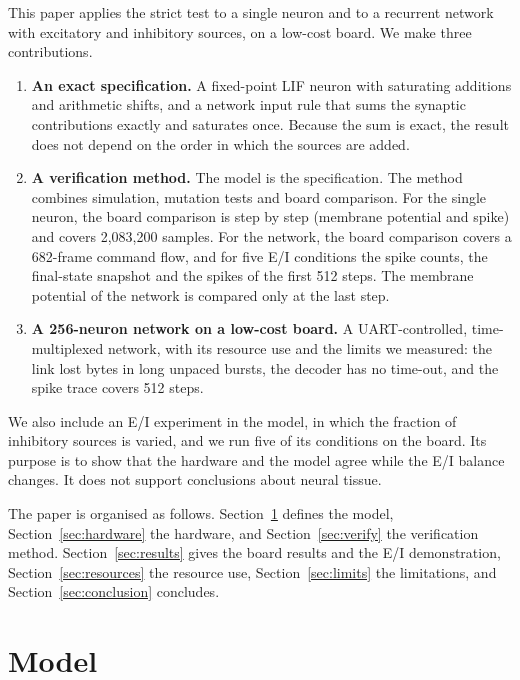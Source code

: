 \documentclass[11pt]{article}
\begin{document}
This paper applies the strict test to a single neuron and to a recurrent network with excitatory and inhibitory sources, on a low-cost board.
We make three contributions.
\begin{enumerate}
\item \textbf{An exact specification.} A fixed-point LIF neuron with saturating additions and arithmetic shifts, and a network input rule that sums the synaptic contributions exactly and saturates once. Because the sum is exact, the result does not depend on the order in which the sources are added.
\item \textbf{A verification method.} The model is the specification. The method combines simulation, mutation tests and board comparison. For the single neuron, the board comparison is step by step (membrane potential and spike) and covers 2,083,200 samples. For the network, the board comparison covers a 682-frame command flow, and for five E/I conditions the spike counts, the final-state snapshot and the spikes of the first 512 steps. The membrane potential of the network is compared only at the last step.
\item \textbf{A 256-neuron network on a low-cost board.} A UART-controlled, time-multiplexed network, with its resource use and the limits we measured: the link lost bytes in long unpaced bursts, the decoder has no time-out, and the spike trace covers 512 steps.
\end{enumerate}
We also include an E/I experiment in the model, in which the fraction of inhibitory sources is varied, and we run five of its conditions on the board.
Its purpose is to show that the hardware and the model agree while the E/I balance changes. It does not support conclusions about neural tissue.

The paper is organised as follows.
Section~\ref{sec:model} defines the model, Section~\ref{sec:hardware} the hardware, and Section~\ref{sec:verify} the verification method.
Section~\ref{sec:results} gives the board results and the E/I demonstration, Section~\ref{sec:resources} the resource use, Section~\ref{sec:limits} the limitations, and Section~\ref{sec:conclusion} concludes.

\section{Model}
\label{sec:model}
\end{document}

